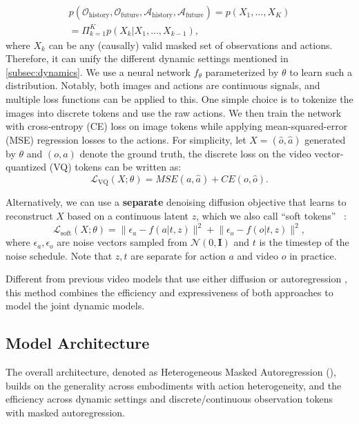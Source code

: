 \begin{align}
p(\mathcal{O}_{\text{history}},\mathcal{O}_{\text{future}},\mathcal{A}_{\text{history}},\mathcal{A}_{\text{future}})=p(X_1,...,X_K) \nonumber \\
   =\Pi_{k=1}^K p(X_k|X_1,...,X_{k-1}),
\end{align}
where $X_k$ can be any (causally) valid masked set of observations and actions. Therefore, it can unify the different dynamic settings mentioned in \cref{subsec:dynamics}. We use a neural network $f_\theta$ parameterized by $\theta$ to learn such a distribution.  Notably, both images and actions are continuous signals, and multiple loss functions can be applied to this. One simple choice is to tokenize the images into discrete tokens and use the raw actions. We then train the network with cross-entropy (CE) loss on image tokens while applying mean-squared-error (MSE) regression losses to the actions. For simplicity, let ${X}=(\hat{o}, \hat{a})$ generated by $\theta$ and $({o}, {a})$ denote the ground truth, the discrete loss on the video vector-quantized (VQ) tokens can be written as:
\begin{equation}
\label{eq:discrete}
    \mathcal{L}_{\text{VQ}}(X;\theta)=MSE(a,\hat{a})+CE(o,\hat{o}).
\end{equation}


Alternatively, we can use a \textbf{separate} denoising diffusion objective that learns to reconstruct $X$ based on a continuous latent $z$, which we also call ``soft tokens'' ~\cite{li2024autoregressive}: 
\begin{equation}
\label{eq:continuous}
    \mathcal{L}_{\text{soft}}(X;\theta)=\lVert \epsilon_a - f(a|t,z) \rVert^2  +\lVert \epsilon_o - f(o|t,z) \rVert^2,
\end{equation}
where $\epsilon_a,\epsilon_o$ are noise vectors sampled from $\mathcal{N}(0,\mathbf{I})$ and $t$ is the timestep of the noise schedule. Note that $z,t$ are separate for action $a$ and video $o$ in practice.

Different from previous video models that use either diffusion \cite{zhu2024irasim,alonso2024diffusion} or autoregression \cite{liu2024mardini,bruce2024genie}, this method combines the efficiency and expressiveness of both approaches to model the joint dynamic models.



\subsection{Model Architecture}
The overall architecture, denoted as  Heterogeneous Masked Autoregression (\ourshort), builds on the generality across embodiments with action heterogeneity, and the efficiency across dynamic settings and discrete/continuous observation tokens with masked autoregression.

